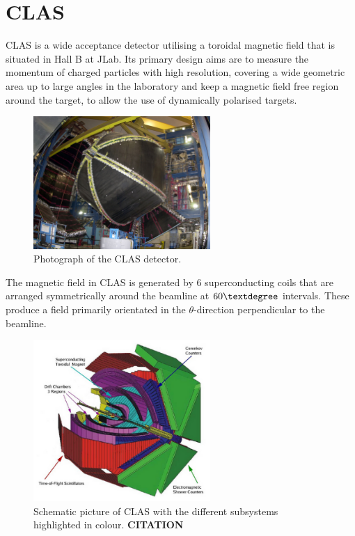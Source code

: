 \section{CLAS}
CLAS is a wide acceptance detector utilising a toroidal magnetic field that is situated in Hall B at JLab. Its primary design aims are to measure the momentum of charged particles with high resolution, covering a wide geometric area up to large angles in the laboratory and keep a magnetic field free region around the target, to allow the use of dynamically polarised targets.

\begin{figure}
	\centering
	\includegraphics[width=0.6\textwidth]{ImgChap1/CLASPhoto}
	\caption{Photograph of the CLAS detector.}
	\label{CLASPhoto}
\end{figure}

The magnetic field in CLAS is generated by 6 superconducting coils that are arranged symmetrically around the beamline at $60\textdegree$ intervals. These produce a field primarily orientated in the $\theta$-direction perpendicular to the beamline.

\begin{figure}
	\centering
	\includegraphics[width=0.6\textwidth]{ImgChap1/CLAS1}
	\caption{Schematic picture of CLAS with the different subsystems highlighted in colour. \textbf{CITATION}}
	\label{CLASDiagram}
\end{figure}

